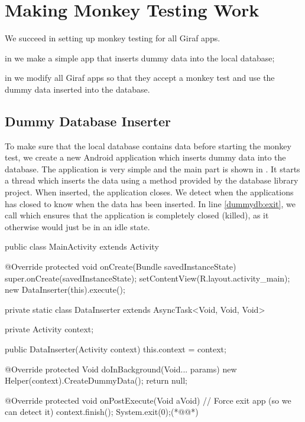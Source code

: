 \chapter{Making Monkey Testing Work}
We succeed in setting up monkey testing for all Giraf apps.

\begin{chapterorganization}
  \item in  we make a simple app that inserts dummy data into the local database;
  \item in  we modify all Giraf apps so that they accept a monkey test and use the dummy data inserted into the database.
\end{chapterorganization}

\section{Dummy Database Inserter}\label{sec:dummy_db_inserter}
To make sure that the local database contains data before starting the monkey test, we create a new Android application which inserts dummy data into the database. The application is very simple and the main part is shown in . It starts a thread which inserts the data using a method provided by the database library project. When inserted, the application closes. We detect when the applications has closed to know when the data has been inserted. In line \ref{dummydb:exit}, we call  which ensures that the application is completely closed (killed), as it otherwise would just be in an idle state.

\begin{javacode}[caption=Dummy database inserter \mono{MainActivity},label=lst:dummy_db_ins_main_activity]
public class MainActivity extends Activity {
    @Override
    protected void onCreate(Bundle savedInstanceState) {
        super.onCreate(savedInstanceState);
        setContentView(R.layout.activity_main);
        new DataInserter(this).execute();
    }

    private static class DataInserter extends AsyncTask<Void, Void, Void> {
        private Activity context;

        public DataInserter(Activity context) {
            this.context = context;
        }

        @Override
        protected Void doInBackground(Void... params) {
            new Helper(context).CreateDummyData();
            return null;
        }

        @Override
        protected void onPostExecute(Void aVoid) {
            // Force exit app (so we can detect it)
            context.finish();
            System.exit(0);(*@\label{dummydb:exit}@*)
        }
    }
}
\end{javacode}


